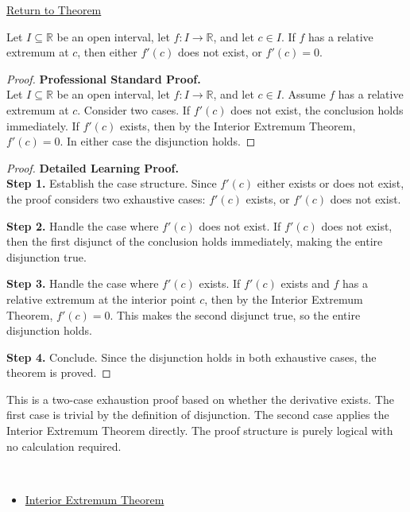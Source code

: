\newpage
{}
\label{prf:relative-extremum-derivatives-equal-0-or-dont-exist}

\begin{remark*}[Return]
\hyperref[cor:necessary-condition-extremum]{Return to Theorem}
\end{remark*}

\begin{theorem*}
Let $I \subseteq \mathbb{R}$ be an open interval, let $f : I \to \mathbb{R}$, and let $c \in I$. If $f$ has a relative extremum at $c$, then either $f'(c)$ does not exist, or $f'(c) = 0$.
\end{theorem*}

\begin{proof}
\textbf{Professional Standard Proof.}~\\
Let $I \subseteq \mathbb{R}$ be an open interval, let $f : I \to \mathbb{R}$, and let $c \in I$. Assume $f$ has a relative extremum at $c$. Consider two cases. If $f'(c)$ does not exist, the conclusion holds immediately. If $f'(c)$ exists, then by the Interior Extremum Theorem, $f'(c) = 0$. In either case the disjunction holds.
\end{proof}

\begin{proof}
\textbf{Detailed Learning Proof.}~\\

\textbf{Step 1.} Establish the case structure. Since $f'(c)$ either exists or does not exist, the proof considers two exhaustive cases: $f'(c)$ exists, or $f'(c)$ does not exist.

\textbf{Step 2.} Handle the case where $f'(c)$ does not exist. If $f'(c)$ does not exist, then the first disjunct of the conclusion holds immediately, making the entire disjunction true.

\textbf{Step 3.} Handle the case where $f'(c)$ exists. If $f'(c)$ exists and $f$ has a relative extremum at the interior point $c$, then by the Interior Extremum Theorem, $f'(c) = 0$. This makes the second disjunct true, so the entire disjunction holds.

\textbf{Step 4.} Conclude. Since the disjunction holds in both exhaustive cases, the theorem is proved.
\end{proof}

\begin{remark*}
This is a two-case exhaustion proof based on whether the derivative exists. The first case is trivial by the definition of disjunction. The second case applies the Interior Extremum Theorem directly. The proof structure is purely logical with no calculation required.
\end{remark*}

\begin{remark*}[Dependencies]~\\
\begin{itemize}
  \item \hyperref[thm:interior-extremum-theorem]{Interior Extremum Theorem}
\end{itemize}
\end{remark*}
